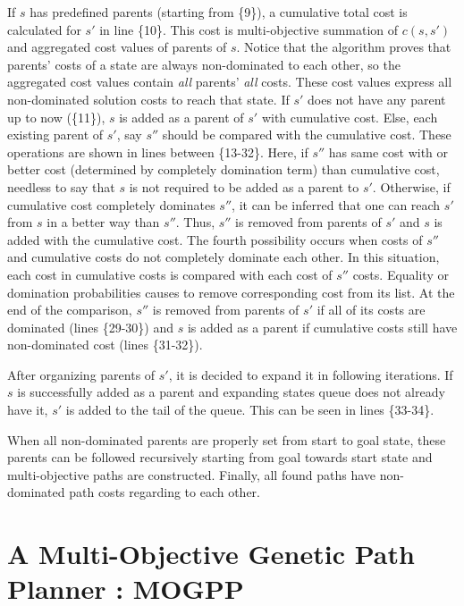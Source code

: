 \documentclass[10pt,journal]{IEEEtran}
\begin{document}
If $s$ has predefined parents (starting from \{9\}), a cumulative total cost is calculated for $s'$ in line \{10\}. This cost is multi-objective summation of $c(s, s')$ and aggregated cost values of parents of $s$. Notice that the algorithm proves that parents' costs of a state are always non-dominated to each other, so the aggregated cost values contain \textit{all} parents' \textit{all} costs. These cost values express all non-dominated solution costs to reach that state. If $s'$ does not have any parent up to now (\{11\}), $s$ is added as a parent of $s'$ with cumulative cost. Else, each existing parent of $s'$, say $s''$ should be compared with the cumulative cost. These operations are shown in lines between \{13-32\}. Here, if $s''$ has same cost with or better cost (determined by completely domination term) than cumulative cost, needless to say that $s$ is not required to be added as a parent to $s'$. Otherwise, if cumulative cost completely dominates $s''$, it can be inferred that one can reach $s'$ from $s$ in a better way than $s''$. Thus, $s''$ is removed from parents of $s'$ and $s$ is added with the cumulative cost. The fourth possibility occurs when costs of $s''$ and cumulative costs do not completely dominate each other. In this situation, each cost in cumulative costs is compared with each cost of $s''$ costs. Equality or domination probabilities causes to remove corresponding cost from its list. At the end of the comparison, $s''$ is removed from parents of $s'$ if all of its costs are dominated (lines \{29-30\}) and $s$ is added as a parent if cumulative costs still have non-dominated cost (lines \{31-32\}).

After organizing parents of $s'$, it is decided to expand it in following iterations. If $s$ is successfully added as a parent and expanding states queue does not already have it, $s'$ is added to the tail of the queue. This can be seen in lines \{33-34\}.

When all non-dominated parents are properly set from start to goal state, these parents can be followed recursively starting from goal towards start state and multi-objective paths are constructed. Finally, all found paths have non-dominated path costs regarding to each other.

\section{A Multi-Objective Genetic Path Planner : MOGPP}
\end{document}
